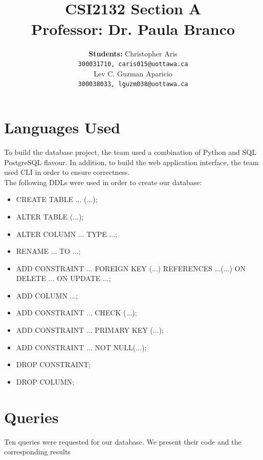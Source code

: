 \documentclass[12pt, lettersize]{article}
\title{\Large \centering{Database Project  } \\ \large \textbf{ CSI2132 Section A \\  Professor: Dr. Paula Branco} }
\author{ \large \textbf{Students:} Christopher Aris \\ 
	\texttt{300031710, caris015@uottawa.ca} \\
	Lev C. Guzman Aparicio \\
	\texttt{300038033, lguzm038@uottawa.ca}
	}
\theoremstyle{Remark}
\begin{document}
	\begin{titlepage}
		\maketitle
	\end{titlepage}

	\section{Languages Used}
	
	To build the database project, the team used a combination of Python and SQL PostgreSQL flavour.
	In addition, to build the web application interface, the team used CLI in order to ensure correctness. \\
	
	The following DDLs were used in order to create our database:
	
	\begin{itemize}
		
		\item CREATE TABLE ... (...);
		
		\item ALTER TABLE (...);
		
		\item  ALTER COLUMN ... TYPE ...;
		
		\item RENAME ... TO ...;
		
		\item ADD CONSTRAINT ... FOREIGN KEY (...) REFERENCES ...(...) ON DELETE ... ON UPDATE ...;
		
		\item ADD COLUMN ...;
		
		\item ADD CONSTRAINT ... CHECK (...);
		
		\item ADD CONSTRAINT ... PRIMARY KEY (...);
		
		\item  ADD CONSTRAINT ... NOT NULL(...);
		
		\item DROP CONSTRAINT;
		
		\item DROP COLUMN;
		
	\end{itemize}

	\newpage

	\section{Queries}
	Ten queries were requested for our database. We present their code and the corresponding results
	
\end{document}
